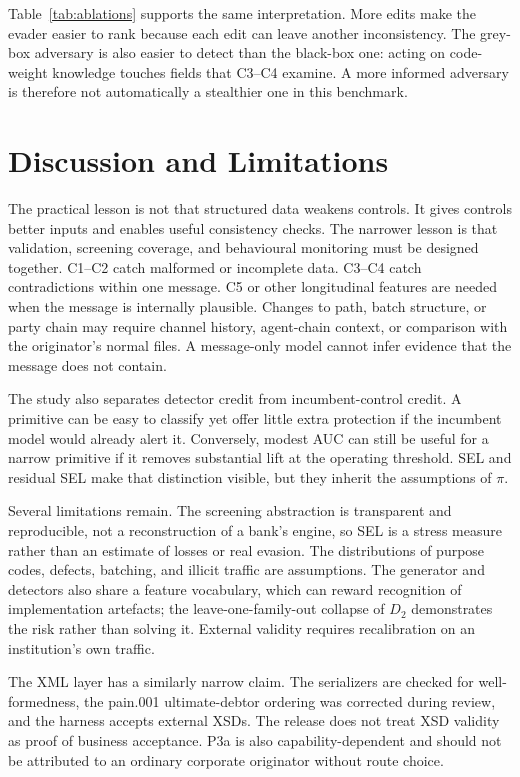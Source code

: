 \documentclass[conference]{IEEEtran}
\begin{document}
Table~\ref{tab:ablations} supports the same interpretation. More edits make the
evader easier to rank because each edit can leave another inconsistency. The
grey-box adversary is also easier to detect than the black-box one: acting on
code-weight knowledge touches fields that C3--C4 examine. A more informed
adversary is therefore not automatically a stealthier one in this benchmark.

\section{Discussion and Limitations}
The practical lesson is not that structured data weakens controls. It gives
controls better inputs and enables useful consistency checks. The narrower
lesson is that validation, screening coverage, and behavioural monitoring must
be designed together. C1--C2 catch malformed or incomplete data. C3--C4 catch
contradictions within one message. C5 or other longitudinal features are
needed when the message is internally plausible. Changes to path, batch
structure, or party chain may require channel history, agent-chain context, or
comparison with the originator's normal files. A message-only model cannot
infer evidence that the message does not contain.

The study also separates detector credit from incumbent-control credit. A
primitive can be easy to classify yet offer little extra protection if the
incumbent model would already alert it. Conversely, modest AUC can still be
useful for a narrow primitive if it removes substantial lift at the operating
threshold. SEL and residual SEL make that distinction visible, but they inherit
the assumptions of $\pi$.

Several limitations remain. The screening abstraction is transparent and
reproducible, not a reconstruction of a bank's engine, so SEL is a stress
measure rather than an estimate of losses or real evasion. The distributions
of purpose codes, defects, batching, and illicit traffic are assumptions. The
generator and detectors also share a feature vocabulary, which can reward
recognition of implementation artefacts; the leave-one-family-out collapse of
$D_2$ demonstrates the risk rather than solving it. External validity requires
recalibration on an institution's own traffic.

The XML layer has a similarly narrow claim. The serializers are checked for
well-formedness, the pain.001 ultimate-debtor ordering was corrected during
review, and the harness accepts external XSDs. The release does not treat XSD
validity as proof of business acceptance. P3a is also capability-dependent and
should not be attributed to an ordinary corporate originator without route
choice.
\end{document}
